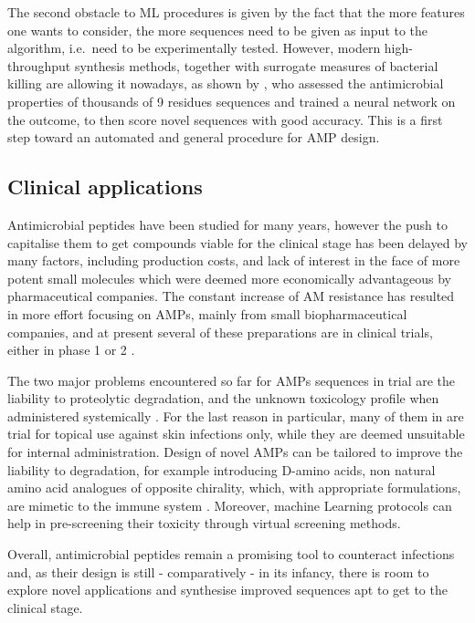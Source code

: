 The second obstacle to ML procedures is given by the fact that the more features one wants to consider, the more sequences need to be given as input to the algorithm, i.e.\ need to be experimentally tested.
%
However, modern high-throughput synthesis methods, together with surrogate measures of bacterial killing are allowing it nowadays, as shown by \citet{Cherkasov2009}, who assessed the antimicrobial properties of thousands of 9 residues sequences and trained a neural network on the outcome, to then score novel sequences with good accuracy. This is a first step toward an automated and general procedure for AMP design.

\subsection{Clinical applications}
Antimicrobial peptides have been studied for many years, however the push to capitalise them to get compounds viable for the clinical stage has been delayed by many factors, including production costs, and lack of interest in the face of more potent small molecules which were deemed more economically advantageous by pharmaceutical companies.
%
The constant increase of AM resistance has resulted in more effort focusing on AMPs, mainly from small biopharmaceutical companies, and at present several of these preparations are in clinical trials, either in phase 1 or 2 \citep{Naafs2018}.

The two major problems encountered so far for AMPs sequences in trial are the liability to proteolytic degradation, and the unknown toxicology profile when administered systemically \citep{Hancock2006}. For the last reason in particular, many of them in are trial for topical use against skin infections only, while they are deemed unsuitable for internal administration.
%
Design of novel AMPs can be tailored to improve the liability to degradation, for example introducing D-amino acids, non natural amino acid analogues of opposite chirality, which, with appropriate formulations, are mimetic to the immune system \citep{Wipf2009}. Moreover, machine Learning protocols can help in pre-screening their toxicity through virtual screening methods.

Overall, antimicrobial peptides remain a promising tool to counteract infections and, as their design is still - comparatively - in its infancy, there is room to explore novel applications and synthesise improved sequences apt to get to the clinical stage.


